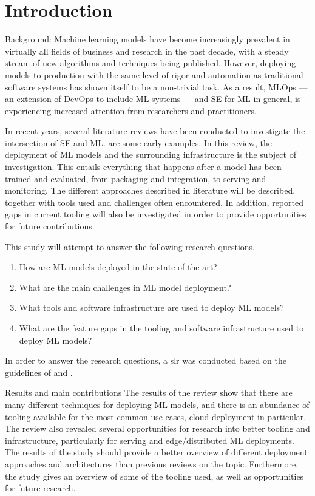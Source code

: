 \chapter{Introduction}
\label{ch:introduction}
Background:
Machine learning models have become increasingly prevalent in virtually all fields of business and research in the past decade, with a steady stream of new algorithms and techniques being published.
However, deploying models to production with the same level of rigor and automation as traditional software systems has shown itself to be a non-trivial task.
As a result, MLOps --- an extension of DevOps to include ML systems --- and SE for ML in general, is experiencing increased attention from researchers and practitioners.

In recent years, several literature reviews have been conducted to investigate the intersection of SE and ML.
\cite{Baier2019, Kumeno2020} are some early examples.
In this review, the deployment of ML models and the surrounding infrastructure is the subject of investigation.
This entails everything that happens after a model has been trained and evaluated, from packaging and integration, to serving and monitoring.
The different approaches described in literature will be described, together with tools used and challenges often encountered.
In addition, reported gaps in current tooling will also be investigated in order to provide opportunities for future contributions.

This study will attempt to answer the following research questions.
\begin{enumerate}
    \item How are ML models deployed in the state of the art?
    \item What are the main challenges in ML model deployment?
    \item What tools and software infrastructure are used to deploy ML models?
    \item What are the feature gaps in the tooling and software infrastructure used to deploy ML models?
\end{enumerate}
In order to answer the research questions, a \acrfull{slr} was conducted based on the guidelines of \cite{Kitchenham07guidelinesfor} and \cite{Wohlin2014}.

Results and main contributions
The results of the review show that there are many different techniques for deploying ML models, and there is an abundance of tooling available for the most common use cases, cloud deployment in particular.
The review also revealed several opportunities for research into better tooling and infrastructure, particularly for serving and edge/distributed ML deployments.
The results of the study should provide a better overview of different deployment approaches and architectures than previous reviews on the topic.
Furthermore, the study gives an overview of some of the tooling used, as well as opportunities for future research.

